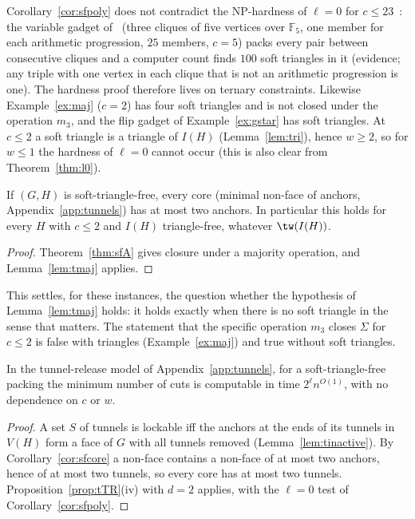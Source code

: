 \begin{remark}[No conflict with the hardness of $\ell=0$]\label{rem:sfLPS}
Corollary~\ref{cor:sfpoly} does not contradict the NP-hardness of $\ell=0$ for $c\le23$~\cite{LPS23}: the variable gadget of~\cite[Sect.~4.1.1]{LPS23} (three cliques of five vertices over $\mathbb F_5$, one member for each arithmetic progression, $25$ members, $c=5$) packs every pair between consecutive cliques and a computer count finds $100$ soft triangles in it (evidence; any triple with one vertex in each clique that is not an arithmetic progression is one). The hardness proof therefore lives on ternary constraints. Likewise Example~\ref{ex:maj} ($c=2$) has four soft triangles and is not closed under the operation $m_3$, and the flip gadget of Example~\ref{ex:gstar} has soft triangles. At $c\le2$ a soft triangle is a triangle of $I(H)$ (Lemma~\ref{lem:tri}), hence $w\ge2$, so for $w\le1$ the hardness of $\ell=0$ cannot occur (this is also clear from Theorem~\ref{thm:l0}).
\end{remark}

\begin{corollary}\label{cor:sfcore}
If $(G,H)$ is soft-triangle-free, every core (minimal non-face of anchors, Appendix~\ref{app:tunnels}) has at most two anchors. In particular this holds for every $H$ with $c\le2$ and $I(H)$ triangle-free, whatever $\tw(I(H))$.
\end{corollary}
\begin{proof}
Theorem~\ref{thm:sfA} gives closure under a majority operation, and Lemma~\ref{lem:tmaj} applies.
\end{proof}
This settles, for these instances, the question whether the hypothesis of Lemma~\ref{lem:tmaj} holds: it holds exactly when there is no soft triangle in the sense that matters. The statement that the specific operation $m_3$ closes $\Sigma$ for $c\le2$ is false with triangles (Example~\ref{ex:maj}) and true without soft triangles.

\begin{corollary}\label{cor:sfTR}
In the tunnel-release model of Appendix~\ref{app:tunnels}, for a soft-triangle-free packing the minimum number of cuts is computable in time $2^{\ell}n^{O(1)}$, with no dependence on $c$ or $w$.
\end{corollary}
\begin{proof}
A set $S$ of tunnels is lockable iff the anchors at the ends of its tunnels in $V(H)$ form a face of $G$ with all tunnels removed (Lemma~\ref{lem:tinactive}). By Corollary~\ref{cor:sfcore} a non-face contains a non-face of at most two anchors, hence of at most two tunnels, so every core has at most two tunnels. Proposition~\ref{prop:tTR}(iv) with $d=2$ applies, with the $\ell=0$ test of Corollary~\ref{cor:sfpoly}.
\end{proof}

